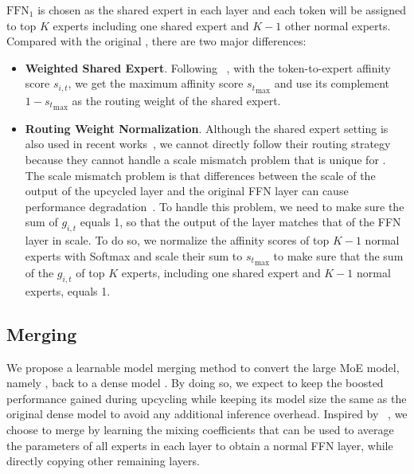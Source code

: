 $\mbox{FFN}_1$ is chosen as the shared expert in each \moe layer and each token will be assigned to top $K$ experts including one shared expert and $K-1$ other normal experts. Compared with the original \sparseupcycle, there are two major differences:
\begin{itemize}[leftmargin=1em]
    \setlength{\parskip}{2pt}
    \setlength\itemsep{0pt}
    \item \textbf{Weighted Shared Expert}. Following \mocle~\cite{gou2024mixture}, with the token-to-expert affinity score $s_{i,t}$, we get the maximum affinity score ${s_{t}}_{\max}$ and use its complement $1-{s_{t}}_{\max}$ as the routing weight of the shared expert.
    \item \textbf{Routing Weight Normalization}. Although the shared expert setting is also used in recent works~\cite{dai2024deepseekmoe, gou2024mixture}, we cannot directly follow their routing strategy because they cannot handle a scale mismatch problem that is unique for \sparseupcycle. The scale mismatch problem is that differences between the scale of the output of the upcycled \moe layer and the original FFN layer can cause performance degradation~\cite{wu2022residual}. To handle this problem, we need to make sure the sum of $g_{i,t}$ equals 1, so that the output of the \moe layer matches that of the FFN layer in scale. To do so, we normalize the affinity scores of top $K-1$ normal experts with Softmax and scale their sum to ${s_{t}}_{\max}$ to make sure that the sum of the $g_{i,t}$ of top $K$ experts, including one shared expert and $K-1$ normal experts, equals 1.
\end{itemize}




\subsection{Merging}\label{sec:merging}
We propose a learnable model merging method to convert the large MoE model, namely \oursmoe, back to a dense model \oursmerge. By doing so, we expect \oursmerge to keep the boosted performance gained during upcycling while keeping its model size the same as the original dense model to avoid any additional inference overhead. Inspired by \modelsoup~\cite{wortsman2022model}, we choose to merge \oursmoe by learning the mixing coefficients that can be used to average the parameters of all experts in each \moe layer to obtain a normal FFN layer, while directly copying other remaining layers. 

